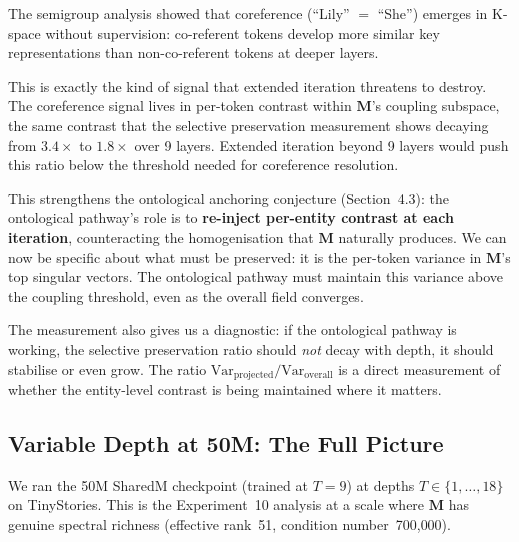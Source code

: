 \documentclass[11pt, a4paper]{article}
\newcommand{\M}{\mathbf{M}}
\theoremstyle{plain}
\theoremstyle{definition}
\theoremstyle{remark}
\begin{document}
The semigroup analysis showed that coreference (``Lily'' $=$ ``She'') emerges in K-space without supervision: co-referent tokens develop more similar key representations than non-co-referent tokens at deeper layers.

This is exactly the kind of signal that extended iteration threatens to destroy.
The coreference signal lives in per-token contrast within $\M$'s coupling subspace, the same contrast that the selective preservation measurement shows decaying from $3.4\times$ to $1.8\times$ over 9 layers.
Extended iteration beyond 9 layers would push this ratio below the threshold needed for coreference resolution.

This strengthens the ontological anchoring conjecture (Section~4.3): the ontological pathway's role is to \textbf{re-inject per-entity contrast at each iteration}, counteracting the homogenisation that $\M$ naturally produces.
We can now be specific about what must be preserved: it is the per-token variance in $\M$'s top singular vectors.
The ontological pathway must maintain this variance above the coupling threshold, even as the overall field converges.

The measurement also gives us a diagnostic: if the ontological pathway is working, the selective preservation ratio should \emph{not} decay with depth, it should stabilise or even grow.
The ratio $\text{Var}_{\text{projected}} / \text{Var}_{\text{overall}}$ is a direct measurement of whether the entity-level contrast is being maintained where it matters.

\subsection{Variable Depth at 50M: The Full Picture}

We ran the 50M SharedM checkpoint (trained at $T{=}9$) at depths $T \in \{1, \ldots, 18\}$ on TinyStories.
This is the Experiment~10 analysis at a scale where $\M$ has genuine spectral richness (effective rank~51, condition number~700{,}000).
\end{document}
